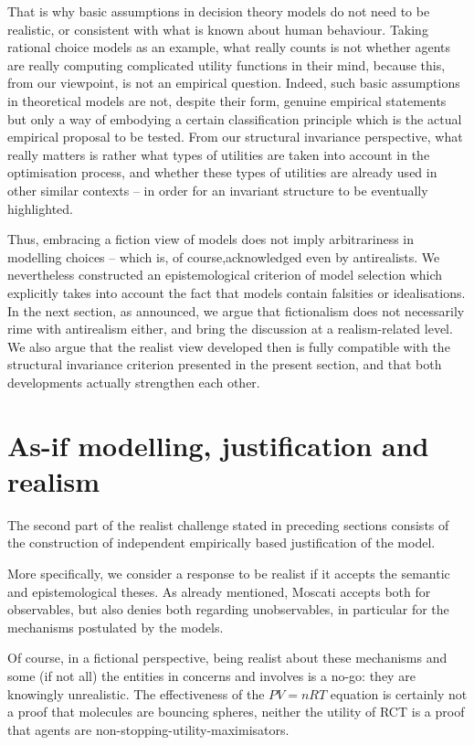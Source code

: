 \documentclass[a4paper,11pt]{article}
\theoremstyle{definition}
\begin{document}
That is why basic assumptions in decision theory models do not need to be realistic, or consistent with what is known about human behaviour. Taking rational choice models as an example, what really counts is not whether agents are really computing complicated utility functions in their mind, because this, from our viewpoint, is not an empirical question. Indeed, such basic assumptions in theoretical models are not, despite their form, genuine empirical statements but only a way of embodying a certain classification principle which is the actual empirical proposal to be tested. From our structural invariance perspective, what really matters is rather what types of utilities are taken into account in the optimisation process, and whether these types of utilities are already used in other similar contexts -- in order for an invariant structure to be eventually highlighted. 

Thus, embracing a fiction view of models does not imply arbitrariness in modelling choices -- which is, of course,acknowledged even by antirealists. We nevertheless constructed an epistemological criterion of model selection which explicitly takes into account the fact that models contain falsities or idealisations. In the next section, as announced, we argue that fictionalism does not necessarily rime with antirealism either, and bring the discussion at a realism-related level. We also argue that the realist view developed then is fully compatible with the structural invariance criterion presented in the present section, and that both developments actually strengthen each other.

\section{As-if modelling, justification and realism}
\label{sec:asif_realism}

The second part of the realist challenge stated in preceding sections consists of the construction of independent empirically based justification of the model.

More specifically, we consider a response to be realist if it accepts the semantic and epistemological theses. As already mentioned, Moscati accepts both for observables, but also denies both regarding unobservables, in particular for the mechanisms postulated by the models.

Of course, in a fictional perspective, being realist about these mechanisms and some (if not all) the entities in concerns and involves is a no-go: they are knowingly unrealistic. The effectiveness of the $PV=nRT$ equation is certainly not a proof that molecules are bouncing spheres, neither the utility of RCT is a proof that agents are non-stopping-utility-maximisators.
\end{document}
